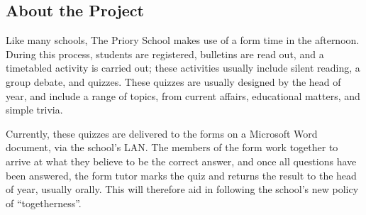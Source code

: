 \subsection{About the Project}
Like many schools, The Priory School makes use of a form time in the afternoon. During this process, students are registered, bulletins are read out, and a timetabled activity is carried out; these activities usually include silent reading, a group debate, and quizzes. These quizzes are usually designed by the head of year, and include a range of topics, from current affairs, educational matters, and simple trivia.

Currently, these quizzes are delivered to the forms on a Microsoft Word document, via the school's LAN. The members of the form work together to arrive at what they believe to be the correct answer, and once all questions have been answered, the form tutor marks the quiz and returns the result to the head of year, usually orally. This will therefore aid in following the school's new policy of ``togetherness''.
